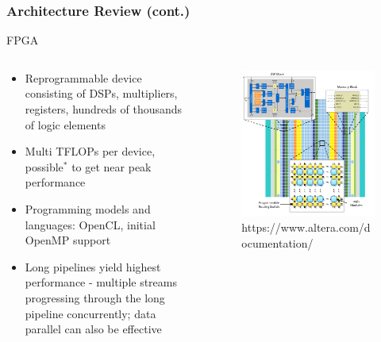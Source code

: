 \documentclass{beamer}
\begin{document}
\begin{frame}
  \frametitle{Architecture Review (cont.)}
  FPGA
  \begin{columns}
    \begin{column}{0.5\textwidth}
      \begin{itemize}
        \item Reprogrammable device consisting of DSPs, multipliers, registers, hundreds of
          thousands of logic elements
        \item Multi TFLOPs per device, possible$^{*}$ to get near peak performance
        \item Programming models and languages: OpenCL, initial OpenMP support
        \item Long pipelines yield highest performance - multiple streams
          progressing through the long pipeline concurrently; data parallel can
          also be effective
      \end{itemize}
    \end{column}
    \begin{column}{0.5\textwidth}
      \begin{figure}
        \centering
        \includegraphics[width=\textwidth]{figures/fpga.png}
        {\tiny https://www.altera.com/documentation/}
      \end{figure}  
    \end{column}
  \end{columns}
\end{frame}
\end{document}
